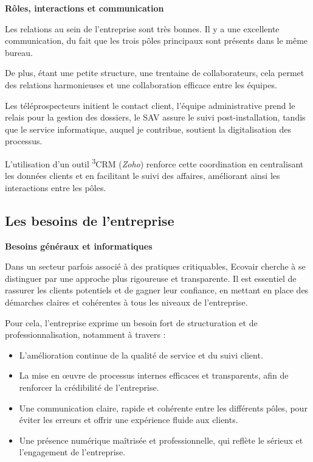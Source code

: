 \textbf{Rôles, interactions et communication}\vspace{0.3cm}

Les relations au sein de l’entreprise sont très bonnes. Il y a une excellente communication, du fait que les trois pôles principaux sont présents dans le même bureau.

De plus, étant une petite structure, une trentaine de collaborateurs, cela permet des relations harmonieuses et une collaboration efficace entre les équipes.

Les téléprospecteurs initient le contact client, l’équipe administrative prend le relais pour la gestion des dossiers, le SAV assure le suivi post-installation, tandis que le service informatique, auquel je contribue, soutient la digitalisation des processus.

L’utilisation d’un outil \textsuperscript{3}CRM (\textit{Zoho}) renforce cette coordination en centralisant les données clients et en facilitant le suivi des affaires, améliorant ainsi les interactions entre les pôles.

\subsection{Les besoins de l’entreprise}

\textbf{Besoins généraux et informatiques}\vspace{0.3cm}

Dans un secteur parfois associé à des pratiques critiquables, Ecovair cherche à se distinguer par une approche plus rigoureuse et transparente. Il est essentiel de rassurer les clients potentiels et de gagner leur confiance, en mettant en place des démarches claires et cohérentes à tous les niveaux de l’entreprise.

Pour cela, l’entreprise exprime un besoin fort de structuration et de professionnalisation, notamment à travers :\vspace{0.3cm}

\begin{itemize}
    \item L’amélioration continue de la qualité de service et du suivi client.\vspace{0.3cm}
    \item La mise en œuvre de processus internes efficaces et transparents, afin de renforcer la crédibilité de l’entreprise.\vspace{0.3cm}
    \item Une communication claire, rapide et cohérente entre les différents pôles, pour éviter les erreurs et offrir une expérience fluide aux clients.\vspace{0.3cm}
    \item Une présence numérique maîtrisée et professionnelle, qui reflète le sérieux et l’engagement de l’entreprise.\vspace{0.3cm}
\end{itemize}

